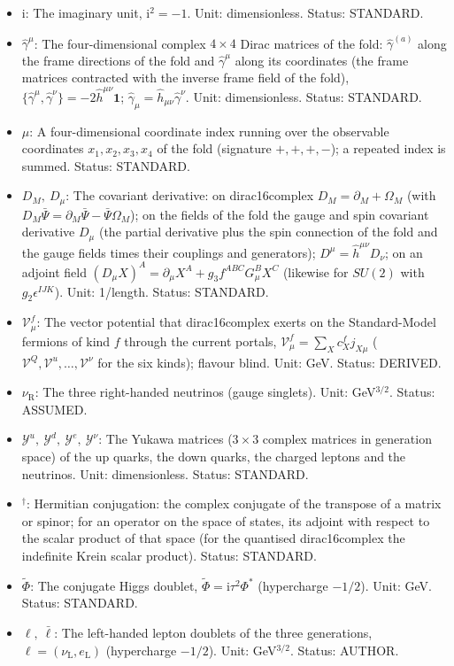 \documentclass[
  10pt,
]{article}
\providecommand{\tightlist}{%
  \setlength{\itemsep}{0pt}\setlength{\parskip}{0pt}}
\begin{document}
\begin{itemize}
\tightlist
\item
  \(\mathrm{i}\): The imaginary unit, \(\mathrm{i}^2 = -1\). Unit:
  dimensionless. Status: STANDARD.
\item
  \(\hat\gamma^\mu\): The four-dimensional complex \(4 \times 4\) Dirac
  matrices of the fold: \(\hat\gamma^{(a)}\) along the frame directions
  of the fold and \(\hat\gamma^\mu\) along its coordinates (the frame
  matrices contracted with the inverse frame field of the fold),
  \(\{\hat\gamma^\mu, \hat\gamma^\nu\} = -2\hat h^{\mu\nu}\mathbf{1}\);
  \(\hat\gamma_\mu = \hat h_{\mu\nu}\hat\gamma^\nu\). Unit:
  dimensionless. Status: STANDARD.
\item
  \(\mu\): A four-dimensional coordinate index running over the
  observable coordinates \(x_1, x_2, x_3, x_4\) of the fold (signature
  \(+,+,+,-\)); a repeated index is summed. Status: STANDARD.
\item
  \(D_M,\ D_\mu\): The covariant derivative: on dirac16complex
  \(D_M = \partial_M + \Omega_M\) (with
  \(D_M\bar\Psi = \partial_M\bar\Psi - \bar\Psi\Omega_M\)); on the
  fields of the fold the gauge and spin covariant derivative \(D_\mu\)
  (the partial derivative plus the spin connection of the fold and the
  gauge fields times their couplings and generators);
  \(D^\mu = \hat h^{\mu\nu}D_\nu\); on an adjoint field
  \((D_\mu X)^A = \partial_\mu X^A + g_3f^{ABC}G^B_\mu X^C\) (likewise
  for \(SU(2)\) with \(g_2\epsilon^{IJK}\)). Unit: 1/length. Status:
  STANDARD.
\item
  \(\mathcal{V}^{f}_\mu\): The vector potential that dirac16complex
  exerts on the Standard-Model fermions of kind \(f\) through the
  current portals, \(\mathcal{V}^{f}_\mu = \sum_Xc^{f}_Xj_{X\mu}\)
  (\(\mathcal{V}^{Q}, \mathcal{V}^{u}, \dots, \mathcal{V}^{\nu}\) for
  the six kinds); flavour blind. Unit: GeV. Status: DERIVED.
\item
  \(\nu_{\mathrm{R}}\): The three right-handed neutrinos (gauge
  singlets). Unit: GeV\(^{3/2}\). Status: ASSUMED.
\item
  \(\mathcal{Y}^{u},\ \mathcal{Y}^{d},\ \mathcal{Y}^{e},\ \mathcal{Y}^{\nu}\):
  The Yukawa matrices (\(3 \times 3\) complex matrices in generation
  space) of the up quarks, the down quarks, the charged leptons and the
  neutrinos. Unit: dimensionless. Status: STANDARD.
\item
  \({}^\dagger\): Hermitian conjugation: the complex conjugate of the
  transpose of a matrix or spinor; for an operator on the space of
  states, its adjoint with respect to the scalar product of that space
  (for the quantised dirac16complex the indefinite Krein scalar
  product). Status: STANDARD.
\item
  \(\tilde\Phi\): The conjugate Higgs doublet,
  \(\tilde\Phi = \mathrm{i}\tau^2\Phi^*\) (hypercharge \(-1/2\)). Unit:
  GeV. Status: STANDARD.
\item
  \(\ell,\ \bar\ell\): The left-handed lepton doublets of the three
  generations, \(\ell = (\nu_{\mathrm{L}}, e_{\mathrm{L}})\)
  (hypercharge \(-1/2\)). Unit: GeV\(^{3/2}\). Status: AUTHOR.
\end{itemize}
\end{document}
